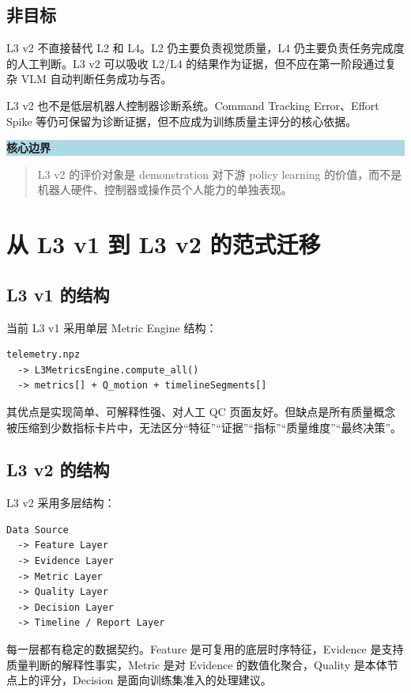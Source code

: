 \documentclass[UTF8,zihao=-4,oneside,openany]{ctexrep}
\newenvironment{notebox}[1]{\vspace{0.5em}\noindent\colorbox{LightBlue}{\parbox{0.96\linewidth}{\textbf{#1}}}\par\vspace{-0.2em}\begin{quote}\small}{\end{quote}\vspace{0.3em}}
\begin{document}
\subsection{非目标}

L3 v2 不直接替代 L2 和 L4。L2 仍主要负责视觉质量，L4 仍主要负责任务完成度的人工判断。L3 v2 可以吸收 L2/L4 的结果作为证据，但不应在第一阶段通过复杂 VLM 自动判断任务成功与否。

L3 v2 也不是低层机器人控制器诊断系统。Command Tracking Error、Effort Spike 等仍可保留为诊断证据，但不应成为训练质量主评分的核心依据。

\begin{notebox}{核心边界}
L3 v2 的评价对象是 demonstration 对下游 policy learning 的价值，而不是机器人硬件、控制器或操作员个人能力的单独表现。
\end{notebox}

\section{从 L3 v1 到 L3 v2 的范式迁移}

\subsection{L3 v1 的结构}

当前 L3 v1 采用单层 Metric Engine 结构：

\begin{verbatim}
telemetry.npz
  -> L3MetricsEngine.compute_all()
  -> metrics[] + Q_motion + timelineSegments[]
\end{verbatim}

其优点是实现简单、可解释性强、对人工 QC 页面友好。但缺点是所有质量概念被压缩到少数指标卡片中，无法区分“特征”“证据”“指标”“质量维度”“最终决策”。

\subsection{L3 v2 的结构}

L3 v2 采用多层结构：

\begin{verbatim}
Data Source
  -> Feature Layer
  -> Evidence Layer
  -> Metric Layer
  -> Quality Layer
  -> Decision Layer
  -> Timeline / Report Layer
\end{verbatim}

每一层都有稳定的数据契约。Feature 是可复用的底层时序特征，Evidence 是支持质量判断的解释性事实，Metric 是对 Evidence 的数值化聚合，Quality 是本体节点上的评分，Decision 是面向训练集准入的处理建议。
\end{document}
